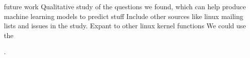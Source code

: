 future work
Qualitative study of the questions we found,
which can help produce machine learning models to predict stuff
Include other sources like linux mailing lists and issues in the study.
Expant to other linux kernel functions
We could use the















.
